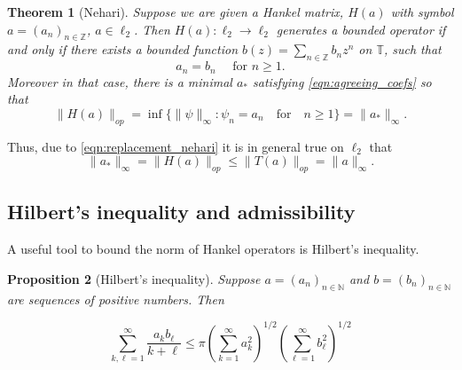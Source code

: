 \documentclass[11pt]{amsart}
\theoremstyle{plain}
\newtheorem{theorem}{Theorem}[section]
\newtheorem{proposition}[theorem]{Proposition}
\theoremstyle{remark}
\numberwithin{equation}{section}
\begin{document}
\begin{theorem}[Nehari]\label{thm:nehari}
Suppose we are given a Hankel matrix, $H(a)$ with symbol $a=(a_n)_{n\in\mathbb{Z}}$, $a\in\ell_2$. Then $H(a):\ell_2\rightarrow\ell_2$ generates a bounded operator if and only if there exists a bounded function $b(z)=\sum_{n\in\mathbb{Z}}b_n z^n$ on $\mathbb{T}$, such that 
\begin{equation}\label{eqn:agreeing_coefs}
a_n=b_n\quad\text{ for } n\geq 1.
\end{equation}
Moreover in that case, there is a minimal $a_*$ satisfying \eqref{eqn:agreeing_coefs} so that
\begin{equation}\label{eqn:replacement_nehari}
\|H(a)\|_{op}=\inf\{\|\psi\|_{\infty}:  \psi_n=a_n\quad\text{for}\quad n\geq 1\}=\|a_*\|_{\infty}.
\end{equation}
\end{theorem}
%
Thus, due to \eqref{eqn:replacement_nehari} it is in general true on $\ell_2$ that
\begin{equation}
\|a_*\|_{\infty}=\|H(a)\|_{op}\leq \|T(a)\|_{op}= \|a\|_{\infty}. 
\end{equation}



\subsection{Hilbert's inequality and admissibility}\label{sec:nehari_hilbert}
A useful tool to bound the norm of Hankel operators is Hilbert's inequality.
\begin{proposition}[Hilbert's inequality]\label{prop:Hilberts_inequality}  
%
%
%
Suppose $a=(a_n)_{n\in\mathbb{N}}$ and $b=(b_n)_{n\in\mathbb{N}}$ are sequences of positive numbers. Then 

\begin{equation}\label{eqn:hilberts_inequality}
\sum_{k,\ell=1}^{\infty}\frac{a_kb_{\ell}}{k+\ell}\leq \pi\left(\sum_{k=1}^{\infty}a_k^2\right)^{1/2}\left(\sum_{\ell=1}^{\infty}b_{\ell}^2\right)^{1/2}
\end{equation}
\end{proposition}
\end{document}
